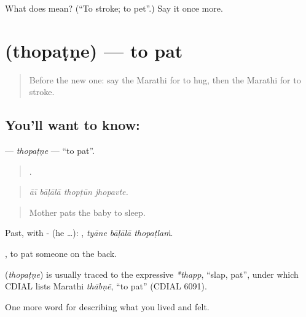\begin{tcolorbox}[breakable,colback=teal!4,colframe=teal!35!black,title={Before you move on}]
What does  mean? (\textquotedblleft{}To stroke; to pet\textquotedblright{}.) Say it once more.
\end{tcolorbox}
\section[\texorpdfstring{\mr{थोपटणे} (thopaṭṇe)}{थोपटणे (thopaṭṇe)}]{ (thopaṭṇe) — to pat}

\label{lesson:MR-C501-thopatne}



\begin{quote}
Before the new one: say the Marathi for to hug, then the Marathi for to stroke.
\end{quote}

\subsection*{You'll want to know: }
\textbf{} — \emph{thopaṭṇe} — \textquotedblleft{}to pat\textquotedblright{}.

\begin{quote}
   .
\end{quote}

\begin{quote}
\emph{āī bāḷālā thopṭūn jhopavte.}
\end{quote}

\begin{quote}
Mother pats the baby to sleep.
\end{quote}

Past, with - (he …):   , \emph{tyāne bāḷālā thopaṭlaṁ}.

 , to pat someone on the back.

\begin{cousinweb}
\textbf{} (\emph{thopaṭṇe}) is usually traced to the expressive \emph{*thapp}, \textquotedblleft{}slap, pat\textquotedblright{}, under which CDIAL lists Marathi \emph{thābṇẽ}, \textquotedblleft{}to pat\textquotedblright{} (CDIAL 6091).
\end{cousinweb}

\begin{grammarlens}[title={What you've built}]
One more word for describing what you lived and felt.
\end{grammarlens}


